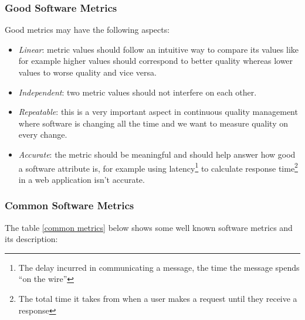 \subsubsection{Good Software Metrics}
Good metrics may have the following aspects:

\begin{itemize}
  \item \emph{Linear}: metric values should follow an intuitive way to compare its values like for example higher values should correspond to better quality whereas lower values to worse quality and vice versa. 
  \item \emph{Independent}: two metric values should not interfere on each other.
  \item \emph{Repeatable}: this is a very important aspect in continuous quality management where software is changing all the time and we want to measure quality on every change.
  \item \emph{Accurate}: the metric should be meaningful and should help answer how good a software attribute is, for example using latency\footnote{The delay incurred in communicating a message, the time the message spends “on the wire”} to calculate response time\footnote{The total time it takes from when a user makes a request until they receive a response} in a web application isn't accurate.       
\end{itemize}


\subsubsection{Common Software Metrics}
The table \ref{common metrics} below shows some well known software metrics and its description:

